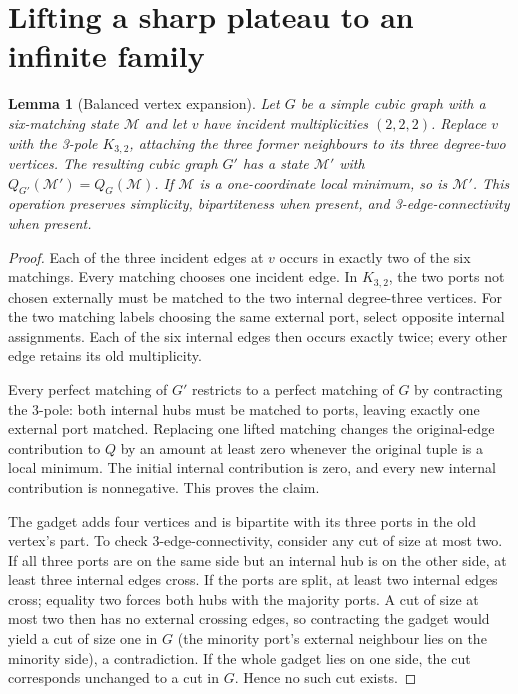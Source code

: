 \documentclass[11pt]{article}
\newtheorem{lemma}[theorem]{Lemma}
\begin{document}
\section{Lifting a sharp plateau to an infinite family}
\begin{lemma}[Balanced vertex expansion]\label{lem:expand}
Let $G$ be a simple cubic graph with a six-matching state
$\mathcal M$ and let $v$ have incident multiplicities $(2,2,2)$.
Replace $v$ with the 3-pole $K_{3,2}$, attaching the three
former neighbours to its three degree-two vertices.
The resulting cubic graph $G'$ has a state $\mathcal M'$ with
$Q_{G'}(\mathcal M')=Q_G(\mathcal M)$. If $\mathcal M$ is a
one-coordinate local minimum, so is $\mathcal M'$.
This operation preserves simplicity, bipartiteness when present,
and 3-edge-connectivity when present.
\end{lemma}
\begin{proof}
Each of the three incident edges at $v$ occurs in exactly two
of the six matchings. Every matching chooses one incident edge.
In $K_{3,2}$, the two ports not chosen externally must be
matched to the two internal degree-three vertices. For the two
matching labels choosing the same external port, select opposite
internal assignments. Each of the six internal edges then occurs
exactly twice; every other edge retains its old multiplicity.

Every perfect matching of $G'$ restricts to a perfect matching
of $G$ by contracting the 3-pole: both internal hubs must be
matched to ports, leaving exactly one external port matched.
Replacing one lifted matching changes the original-edge
contribution to $Q$ by an amount at least zero whenever the
original tuple is a local minimum. The initial internal
contribution is zero, and every new internal contribution is
nonnegative. This proves the claim.

The gadget adds four vertices and is bipartite with its three
ports in the old vertex's part. To check 3-edge-connectivity,
consider any cut of size at most two. If all three ports are
on the same side but an internal hub is on the other side,
at least three internal edges cross. If the ports are split,
at least two internal edges cross; equality two forces both
hubs with the majority ports. A cut of size at most two then
has no external crossing edges, so contracting the gadget
would yield a cut of size one in $G$ (the minority port's
external neighbour lies on the minority side), a contradiction.
If the whole gadget lies on one side, the cut corresponds
unchanged to a cut in $G$. Hence no such cut exists.
\end{proof}
\end{document}
